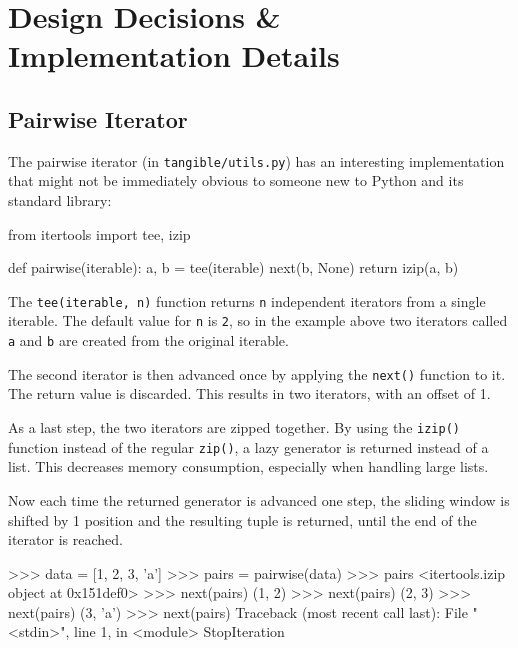 
\chapter{Design Decisions \& Implementation Details}

\label{ch:design}


\section{Pairwise Iterator} \label{sec:design:pairwise}

The pairwise iterator (in \texttt{tangible/utils.py}) has an interesting
implementation that might not be immediately obvious to someone new to Python
and its standard library:

\vspace{.5\baselineskip}
\begin{pythoncode}
from itertools import tee, izip

def pairwise(iterable):
    a, b = tee(iterable)
    next(b, None)
    return izip(a, b)
\end{pythoncode}

\noindent The \texttt{tee(iterable, n)} function returns \texttt{n} independent
iterators from a single iterable. The default value for \texttt{n} is
\texttt{2}, so in the example above two iterators called \texttt{a} and
\texttt{b} are created from the original iterable.

The second iterator is then advanced once by applying the \texttt{next()}
function to it. The return value is discarded. This results in two iterators,
with an offset of 1.

As a last step, the two iterators are zipped together. By using the
\texttt{izip()} function instead of the regular \texttt{zip()}, a lazy generator
is returned instead of a list. This decreases memory consumption, especially
when handling large lists.

Now each time the returned generator is advanced one step, the sliding window is
shifted by 1 position and the resulting tuple is returned, until the end of the
iterator is reached.

\vspace{.5\baselineskip}
\begin{pythoncode}
>>> data = [1, 2, 3, 'a']
>>> pairs = pairwise(data)
>>> pairs
<itertools.izip object at 0x151def0>
>>> next(pairs)
(1, 2)
>>> next(pairs)
(2, 3)
>>> next(pairs)
(3, 'a')
>>> next(pairs)
Traceback (most recent call last):
  File "<stdin>", line 1, in <module>
	StopIteration
\end{pythoncode}

